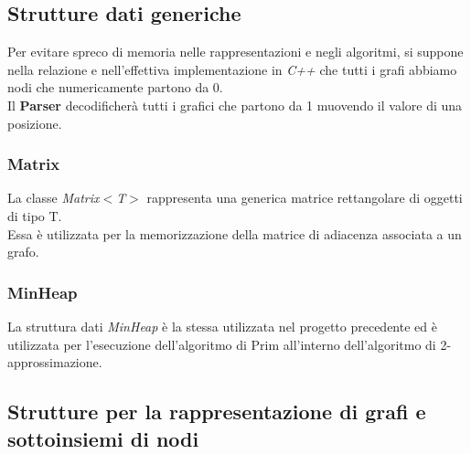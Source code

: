 \documentclass[]{article}
\begin{document}
\subsection{Strutture dati generiche}
Per evitare spreco di memoria nelle rappresentazioni e negli algoritmi, si suppone nella relazione e nell'effettiva implementazione in \textit{C++} che tutti i grafi abbiamo nodi che numericamente partono da 0.\\
Il \textbf{Parser} decodificherà tutti i grafici che partono da 1 muovendo il valore di una posizione.
\subsubsection{Matrix}
La classe \textit{Matrix$<$T$>$} rappresenta una generica matrice rettangolare di oggetti di tipo T.\\
Essa è utilizzata per la memorizzazione della matrice di adiacenza associata a un grafo.
\subsubsection{MinHeap}
La struttura dati \textit{MinHeap} è la stessa utilizzata nel progetto precedente ed è utilizzata per l'esecuzione dell'algoritmo di Prim all'interno dell'algoritmo di 2-approssimazione.
\subsection{Strutture per la rappresentazione di grafi e sottoinsiemi di nodi}
\end{document}
